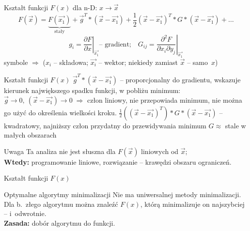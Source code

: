   \begin{frame}{Kształt funkcji $ F(x) $}
    dla n-D: $ x \to \vec{x} $
    \begin{displaymath}
      F(\vec{x}) = \underbrace{F(\vec{x_1})}_{\text{stały}} +
      \vec{g}^T * (\vec{x} - \vec{x_1}) +
      \frac{1}{2}(\vec{x} - \vec{x_1})^T * G * (\vec{x} - \vec{x_1}) + \dots
    \end{displaymath}
    \begin{displaymath}
      g_i = \left. \frac{\partial F}{\partial x} \right|_{\vec{x_1}} \text{-- gradient;}\quad
      G_{ij} = \left. \frac{\partial^2 F}{\partial x_i \partial y_j} \right|_{\vec{x_1}}
    \end{displaymath}
    symbole $ \Rightarrow $ ($ x_i $ -- składowa; $ \vec{x_i} $
    -- wektor; niekiedy zamiast $ \vec{x} $ -- samo~$ x $)

  \end{frame}

  \begin{frame}{Kształt funkcji $ F(x) $}
    $ \vec{g}^T * (\vec{x} - \vec{x_1}) $ -- proporcjonalny do
    gradientu, wskazuje kierunek największego spadku funkcji,
    w pobliżu minimum: $ \vec{g} \to 0{,}\ (\vec{x} - \vec{x_1}) \to 0
    \; \Rightarrow $ człon liniowy, nie przepowiada minimum,
    nie można go użyć do określenia wielkości kroku.
    $ \frac{1}{2}((\vec{x} - \vec{x_1})^T) * G * (\vec{x} - \vec{x_1}) $
    -- kwadratowy, najniższy człon przydatny do przewidywania minimum
    $ G \approx $ stale w małych obszarach
    \begin{alertblock}{Uwaga}
      Ta analiza nie jest słuszna dla $ F(\vec{x}) $ liniowych
      od $ \vec{x} $;\\
      \textbf{Wtedy:} programowanie liniowe, rozwiązanie --
      krawędzi obszaru ograniczeń.
    \end{alertblock}
  \end{frame}

  \begin{frame}{Kształt funkcji $ F(x) $}
    \begin{block}{Optymalne algorytmy minimalizacji}
      Nie ma uniwersalnej metody minimalizacji. Dla b.~złego
      algorytmu można znaleźć $ F(x) $, którą minimalizuje on
      najszybciej -- i~odwrotnie.\\
      \textbf{Zasada:} dobór algorytmu do funkcji.

    \end{block}

  \end{frame}
